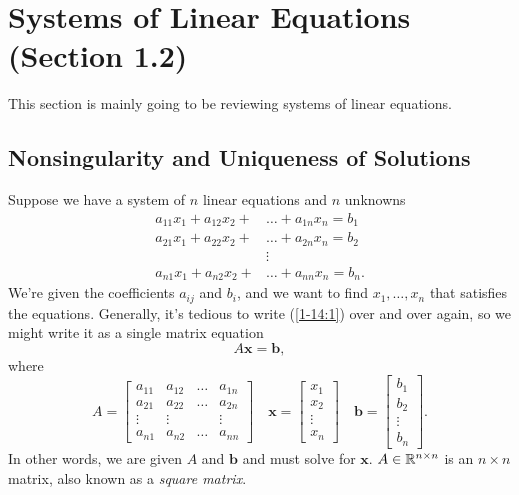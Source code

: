 \documentclass[letterpaper]{article}
\newcommand{\mb}{\mathbf{b}}
\newcommand{\mx}{\mathbf{x}}
\begin{document}
\section{Systems of Linear Equations (Section 1.2)}
This section is mainly going to be reviewing systems of linear equations.

\subsection{Nonsingularity and Uniqueness of Solutions}
Suppose we have a system of $n$ linear equations and $n$ unknowns
\begin{equation} \label{1-14:1}
    \begin{split}
        a_{11}x_1 + a_{12}x_2 + &\hdots + a_{1n}x_n = b_1 \\
        a_{21}x_1 + a_{22}x_2 + &\hdots + a_{2n}x_n = b_2 \\
        &\vdots \\
        a_{n1}x_1 + a_{n2}x_2 + &\hdots + a_{nn}x_n = b_n.
    \end{split}
\end{equation}
We're given the coefficients $a_{ij}$ and $b_i$, and we want to find $x_1, \hdots, x_n$ that satisfies the equations. Generally, it's tedious to write (\ref{1-14:1}) over and over again, so we might write it as a single matrix equation 
\begin{equation} \label{1-14:2}
    A\mx = \mb,
\end{equation}
where 
\[A = \begin{bmatrix}
    a_{11} & a_{12} & \hdots & a_{1n} \\ 
    a_{21} & a_{22} & \hdots & a_{2n} \\ 
    \vdots & \vdots &        & \vdots \\ 
    a_{n1} & a_{n2} & \hdots & a_{nn}
\end{bmatrix} \quad \mx = \begin{bmatrix}
    x_1 \\ x_2 \\ \vdots \\ x_n
\end{bmatrix} \quad \mb = \begin{bmatrix}
    b_1 \\ b_2 \\ \vdots \\ b_n
\end{bmatrix}.\]
In other words, we are given $A$ and $\mb$ and must solve for $\mx$. $A \in \mathbb{R}^{n \times n}$ is an $n \times n$ matrix, also known as a \emph{square matrix}.
\end{document}
